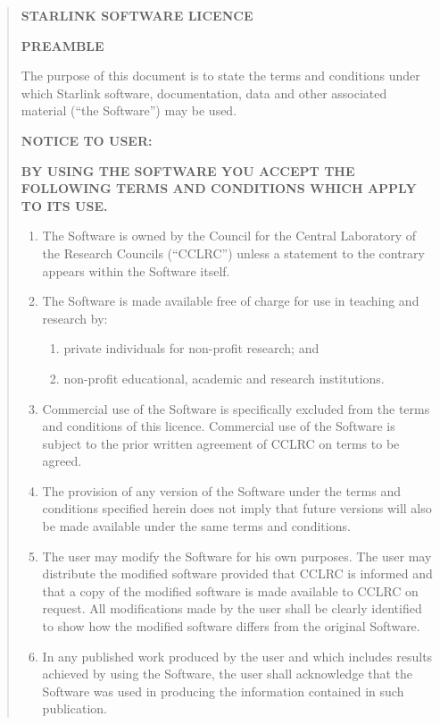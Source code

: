 \documentclass[twoside,11pt]{article}
\renewcommand{\_}{\texttt{\symbol{95}}}
\newcommand{\latexonlysmall}{\small}
\newcommand{\latexonlysmall}{}
\begin{document}
\begin{quote}
\latexonlysmall
\begin{center}\textbf{STARLINK SOFTWARE LICENCE}\end{center}

\textbf{PREAMBLE}

The purpose of this document is to state the terms and conditions
under which Starlink software, documentation, data and other associated
material (``the Software'') may be used.
\par
\textbf{NOTICE TO USER:}
\par
\textbf{BY USING THE SOFTWARE YOU ACCEPT THE FOLLOWING TERMS AND CONDITIONS
WHICH APPLY TO ITS USE.}

\begin{enumerate}
\item The Software is owned by the Council for the Central Laboratory of the
Research Councils (``CCLRC'') unless a statement to the contrary appears
within the Software itself.

\item The Software is made available free of charge for use in teaching and
research by:
\begin{enumerate}
\item private individuals for non-profit research; and
\item non-profit educational, academic and research institutions.
\end{enumerate}

\item Commercial use of the Software is specifically excluded from the terms
and conditions of this licence.  Commercial use of the Software is subject
to the prior written agreement of CCLRC on terms to be agreed.

\item The provision of any version of the Software under the terms and
conditions specified herein does not imply that future versions will also
be made available under the same terms and conditions.

\item The user may modify the Software for his own purposes.  The user may
distribute the modified software provided that CCLRC is informed and that
a copy of the modified software is made available to CCLRC on request.
All modifications made by the user shall be clearly identified to show how
the modified software differs from the original Software.

\item In any published work produced by the user and which includes results
achieved by using the Software, the user shall acknowledge that the Software
was used in producing the information contained in such publication.


\end{enumerate}
\end{quote}
\end{document}
